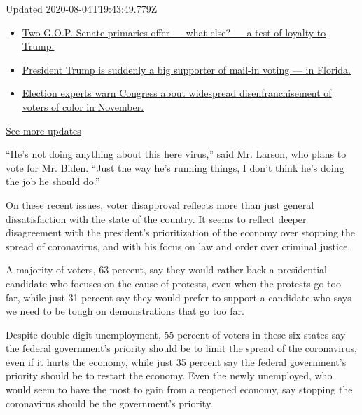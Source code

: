 Updated 2020-08-04T19:43:49.779Z

\begin{itemize}
\tightlist
\item
  \href{https://www.nytimes3xbfgragh.onion/2020/08/04/us/elections/primary-election-michigan-arizona-kansas.html?action=click\&pgtype=Article\&state=default\&region=MAIN_CONTENT_1\&context=storylines_live_updates\#link-3924dd44}{Two
  G.O.P. Senate primaries offer --- what else? --- a test of loyalty to
  Trump.}
\item
  \href{https://www.nytimes3xbfgragh.onion/2020/08/04/us/elections/primary-election-michigan-arizona-kansas.html?action=click\&pgtype=Article\&state=default\&region=MAIN_CONTENT_1\&context=storylines_live_updates\#link-32b39e33}{President
  Trump is suddenly a big supporter of mail-in voting --- in Florida.}
\item
  \href{https://www.nytimes3xbfgragh.onion/2020/08/04/us/elections/primary-election-michigan-arizona-kansas.html?action=click\&pgtype=Article\&state=default\&region=MAIN_CONTENT_1\&context=storylines_live_updates\#link-6d019753}{Election
  experts warn Congress about widespread disenfranchisement of voters of
  color in November.}
\end{itemize}

\href{https://www.nytimes3xbfgragh.onion/2020/08/04/us/elections/primary-election-michigan-arizona-kansas.html?action=click\&pgtype=Article\&state=default\&region=MAIN_CONTENT_1\&context=storylines_live_updates}{See
more updates}

``He's not doing anything about this here virus,'' said Mr. Larson, who
plans to vote for Mr. Biden. ``Just the way he's running things, I don't
think he's doing the job he should do.''

On these recent issues, voter disapproval reflects more than just
general dissatisfaction with the state of the country. It seems to
reflect deeper disagreement with the president's prioritization of the
economy over stopping the spread of coronavirus, and with his focus on
law and order over criminal justice.

A majority of voters, 63 percent, say they would rather back a
presidential candidate who focuses on the cause of protests, even when
the protests go too far, while just 31 percent say they would prefer to
support a candidate who says we need to be tough on demonstrations that
go too far.

Despite double-digit unemployment, 55 percent of voters in these six
states say the federal government's priority should be to limit the
spread of the coronavirus, even if it hurts the economy, while just 35
percent say the federal government's priority should be to restart the
economy. Even the newly unemployed, who would seem to have the most to
gain from a reopened economy, say stopping the coronavirus should be the
government's priority.

